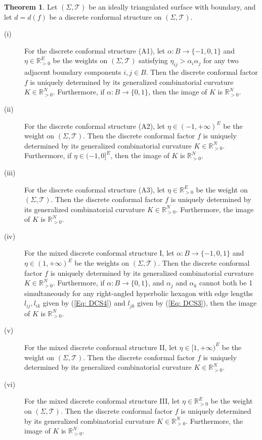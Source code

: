 \documentclass[12pt]{amsart}
\theoremstyle{definition}
\newtheorem{theorem}{Theorem}[section]
\begin{document}
\begin{theorem}\label{Thm: rigidity and image}
Let $(\Sigma,\mathcal{T})$ be an ideally triangulated surface with boundary, and let $d=d(f)$ be a discrete conformal structure on $(\Sigma,\mathcal{T})$.
\begin{description}
\item[(i)]
For the discrete conformal structure (A1), let $\alpha: B\rightarrow \{-1,0,1\}$ and $\eta\in \mathbb{R}_{>0}^E$ be the weights on $(\Sigma,\mathcal{T})$ satisfying $\eta_{ij}>\alpha_i\alpha_j$ for any two adjacent boundary components $i,j\in B$.
Then the discrete conformal factor $f$ is uniquely determined by its generalized combinatorial curvature $K\in \mathbb{R}^N_{>0}$.
Furthermore, if $\alpha: B\rightarrow \{0,1\}$, then
the image of $K$ is $\mathbb{R}^N_{>0}$.

\item[(ii)]
For the discrete conformal structure (A2), let $\eta\in (-1,+\infty)^E$ be the weight on $(\Sigma,\mathcal{T})$.
Then the discrete conformal factor $f$ is uniquely determined by its generalized combinatorial curvature $K\in \mathbb{R}^N_{>0}$.
Furthermore, if $\eta\in (-1,0]^E$, then
the image of $K$ is $\mathbb{R}^N_{>0}$.

\item[(iii)]
For the discrete conformal structure (A3), let $\eta\in \mathbb{R}_{>0}^E$ be the weight on $(\Sigma,\mathcal{T})$.
Then the discrete conformal factor $f$ is uniquely determined by its generalized combinatorial curvature $K\in \mathbb{R}^N_{>0}$.
Furthermore, the image of $K$ is $\mathbb{R}^N_{>0}$.

\item[(iv)]
For the mixed discrete conformal structure I,
let $\alpha: B\rightarrow \{-1,0,1\}$ and $\eta\in (1,+\infty)^E$ be the weights on $(\Sigma,\mathcal{T})$.
Then the discrete conformal factor $f$ is uniquely determined by its generalized combinatorial curvature $K\in \mathbb{R}^N_{>0}$.
Furthermore, if $\alpha: B\rightarrow \{0,1\}$, and $\alpha_j$ and $\alpha_k$ cannot both be 1 simultaneously for any right-angled hyperbolic hexagon with edge lengths $l_{ij},l_{ik}$ given by (\ref{Eq: DCS4}) and $l_{jk}$ given by (\ref{Eq: DCS3}),
then the image of $K$ is $\mathbb{R}^N_{>0}$.

\item[(v)]
For the mixed discrete conformal structure II, let $\eta\in [1,+\infty)^E$ be the weight on $(\Sigma,\mathcal{T})$.
Then the discrete conformal factor $f$ is uniquely determined by its generalized combinatorial curvature $K\in \mathbb{R}^N_{>0}$.

\item[(vi)]
For the mixed discrete conformal structure III, let $\eta\in \mathbb{R}_{>0}^E$ be the weight on $(\Sigma,\mathcal{T})$.
Then the discrete conformal factor $f$ is uniquely determined by its generalized combinatorial curvature $K\in \mathbb{R}^N_{>0}$.
Furthermore, the image of $K$ is $\mathbb{R}^N_{>0}$.
\end{description}
\end{theorem}
\end{document}

